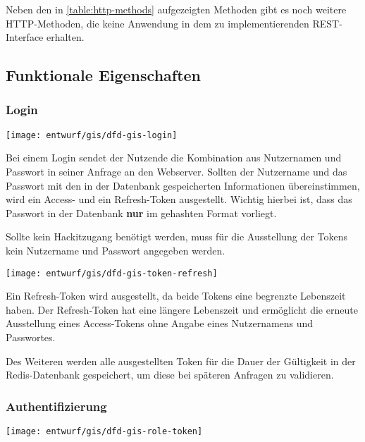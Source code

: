 Neben den in \autoref{table:http-methods} aufgezeigten Methoden gibt es noch weitere HTTP-Methoden, die keine Anwendung in dem zu implementierenden REST-Interface erhalten.

\subsection{Funktionale Eigenschaften}
\subsubsection{Login}\label{subsub:login}
\begin{center}
	\texttt{[image: entwurf/gis/dfd-gis-login]}
\end{center}

Bei einem Login sendet der Nutzende die Kombination aus Nutzernamen und Passwort in seiner Anfrage an den Webserver. Sollten der Nutzername und das Passwort mit den in der Datenbank gespeicherten Informationen übereinstimmen, wird ein Access- und ein Refresh-Token ausgestellt. Wichtig hierbei ist, dass das Passwort in der Datenbank \textbf{nur} im gehashten Format vorliegt.

Sollte kein Hackitzugang benötigt werden, muss für die Ausstellung der Tokens kein Nutzername und Passwort angegeben werden.

\begin{center}
	\texttt{[image: entwurf/gis/dfd-gis-token-refresh]}
\end{center}

Ein Refresh-Token wird ausgestellt, da beide Tokens eine begrenzte Lebenszeit haben. Der Refresh-Token hat eine längere Lebenszeit und ermöglicht die erneute Ausstellung eines \linebreak Access-Tokens ohne Angabe eines Nutzernamens und Passwortes.

Des Weiteren werden alle ausgestellten Token für die Dauer der Gültigkeit in der Redis-Datenbank gespeichert, um diese bei späteren Anfragen zu validieren. 

\subsubsection{Authentifizierung}
\begin{center}
	\texttt{[image: entwurf/gis/dfd-gis-role-token]}
\end{center}


